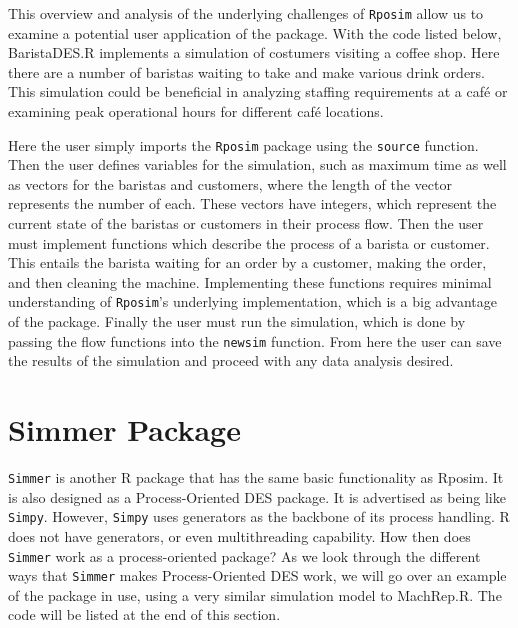 \documentclass[a4paper, 11pt]{article} %
\begin{document}
This overview and analysis of the underlying challenges of \texttt{Rposim} allow us to examine a potential user application of the package. With the code listed below, BaristaDES.R implements a simulation of costumers visiting a coffee shop. Here there are a number of baristas waiting to take and make various drink orders. This simulation could be beneficial in analyzing staffing requirements at a café or examining peak operational hours for different café locations.

Here the user simply imports the \texttt{Rposim} package using the \texttt{source} function. Then the user defines variables for the simulation, such as maximum time as well as vectors for the baristas and customers, where the length of the vector represents the number of each. These vectors have integers, which represent the current state of the baristas or customers in their process flow. Then the user must implement functions which describe the process of a barista or customer. This entails the barista waiting for an order by a customer, making the order, and then cleaning the machine. Implementing these functions requires minimal understanding of \texttt{Rposim}'s underlying implementation, which is a big advantage of the package. Finally the user must run the simulation, which is done by passing the flow functions into the \texttt{newsim} function. From here the user can save the results of the simulation and proceed with any data analysis desired. \newline


\pagebreak




\section{Simmer Package}


\texttt{Simmer} is another R package that has the same basic functionality as Rposim. It is also designed as a Process-Oriented DES package. It is advertised as being like \texttt{Simpy}. However, \texttt{Simpy} uses generators as the backbone of its process handling. R does not have generators, or even multithreading capability. How then does \texttt{Simmer} work as a process-oriented package? As we look through the different ways that \texttt{Simmer} makes Process-Oriented DES work, we will go over an example of the package in use, using a very similar simulation model to MachRep.R. The code will be listed at the end of this section.
\end{document}
